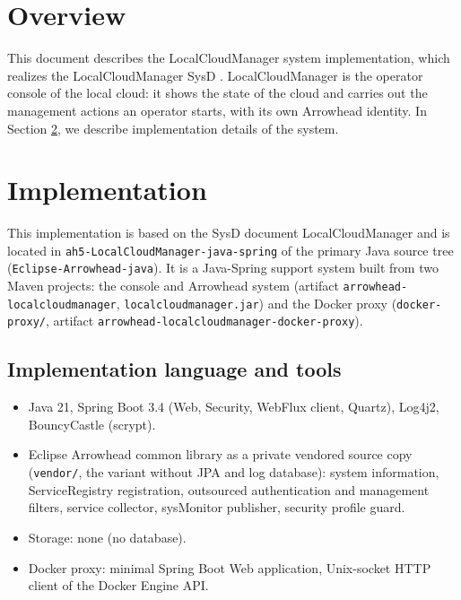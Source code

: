 \documentclass[a4paper]{arrowhead}
\begin{document}
\section{Overview}
\label{sec:overview}

This document describes the LocalCloudManager system implementation, which realizes the LocalCloudManager SysD \cite{lcm-sysd}. LocalCloudManager is the operator console of the local cloud: it shows the state of the cloud and carries out the management actions an operator starts, with its own Arrowhead identity.
In Section \ref{Implementation}, we describe implementation details of the system.

\newpage

\section{Implementation}
\label{Implementation}

This implementation is based on the SysD document LocalCloudManager \cite{lcm-sysd} and is located in \texttt{ah5-LocalCloudManager-java-spring} of the primary Java source tree (\texttt{Eclipse-Arrowhead-java}). It is a Java-Spring support system built from two Maven projects: the console and Arrowhead system (artifact \texttt{arrowhead-\allowbreak{}localcloudmanager}, \texttt{localcloudmanager.\allowbreak{}jar}) and the Docker proxy (\texttt{docker-\allowbreak{}proxy/}, artifact \texttt{arrowhead-\allowbreak{}localcloudmanager-\allowbreak{}docker-\allowbreak{}proxy}).

\subsection{Implementation language and tools}
\begin{itemize}
\item Java 21, Spring Boot 3.4 (Web, Security, WebFlux client, Quartz), Log4j2, BouncyCastle (scrypt).
\item Eclipse Arrowhead common library as a private vendored source copy (\texttt{vendor/}, the variant without JPA and log database): system information, ServiceRegistry registration, outsourced authentication and management filters, service collector, sysMonitor publisher, security profile guard.
\item Storage: none (no database).
\item Docker proxy: minimal Spring Boot Web application, Unix-socket HTTP client of the Docker Engine API.
\end{itemize}
\end{document}

